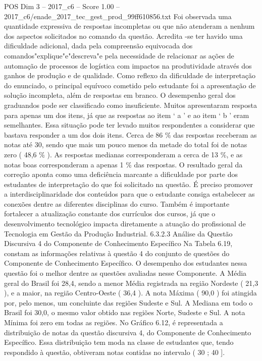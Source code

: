 \begin{textsample}{POS Dim 3 – 2017\_c6 – Score 1.00 – 2017\_c6/enade\_2017\_tec\_gest\_prod\_99ff610856.txt}
Foi observada uma quantidade expressiva de respostas incompletas ou que não atenderam a nenhum dos aspectos solicitados no comando da questão.
Acredita -se ter havido uma dificuldade adicional, dada pela compreensão equivocada dos comandos"explique"e"descreva"e pela necessidade de relacionar as ações de automação de processos de logística com impactos na produtividade através dos ganhos de produção e de qualidade.
Como reflexo da dificuldade de interpretação do enunciado, o principal equívoco cometido pelo estudante foi a apresentação de solução incompleta, além de respostas em branco.
O desempenho geral dos graduandos pode ser classificado como insuficiente.
Muitos apresentaram resposta para apenas um dos itens, já que as respostas ao item ‘ a ’ e ao item ‘ b ’ eram semelhantes.
Essa situação pode ter levado muitos respondentes a considerar que bastava responder a um dos dois itens.
Cerca de 86 \% das respostas receberam as notas até 30, sendo que mais um pouco menos da metade do total foi de notas zero ( 48,6 \% ).
As respostas medianas corresponderam a cerca de 13 \%, e as notas boas corresponderam a apenas 1 \% das respostas.
O resultado geral da correção aponta como uma deficiência marcante a dificuldade por parte dos estudantes de interpretação do que foi solicitado na questão.
É preciso promover a interdisciplinaridade dos conteúdos para que o estudante consiga estabelecer as conexões dentre as diferentes disciplinas do curso.
Também é importante fortalecer a atualização constante dos currículos dos cursos, já que o desenvolvimento tecnológico impacta diretamente a atuação do profissional de Tecnologia em Gestão da Produção Industrial. 6.3.2.3 Análise da Questão Discursiva 4 do Componente de Conhecimento Específico Na Tabela 6.19, constam as informações relativas à questão 4 do conjunto de questões do Componente de Conhecimento Específico.
O desempenho dos estudantes nessa questão foi o melhor dentre as questões avaliadas nesse Componente.
A Média geral do Brasil foi 28,4, sendo a menor Média registrada na região Nordeste ( 21,3 ), e a maior, na região Centro-Oeste ( 36,4 ).
A nota Máxima ( 90,0 ) foi atingida por, pelo menos, um concluinte das regiões Sudeste e Sul.
A Mediana em todo o Brasil foi 30,0, o mesmo valor obtido nas regiões Norte, Sudeste e Sul.
A nota Mínima foi zero em todas as regiões.
No Gráfico 6.12, é representada a distribuição de notas da questão discursiva 4, do Componente de Conhecimento Específico.
Essa distribuição tem moda na classe de estudantes que, tendo respondido à questão, obtiveram notas contidas no intervalo ( 30 ; 40 ].

\end{textsample}
